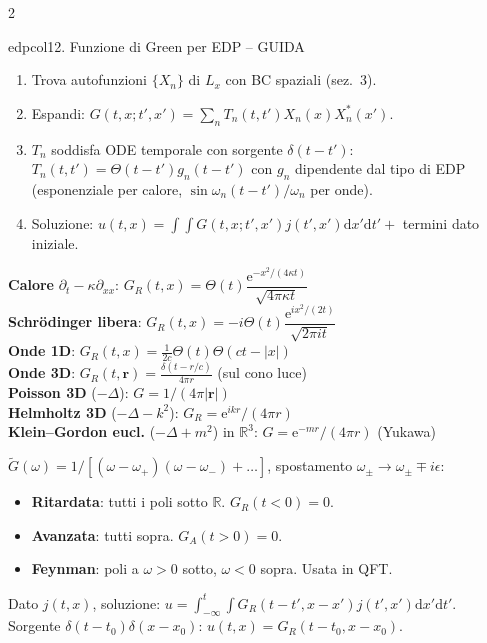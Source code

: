 \documentclass[10pt,a4paper]{article}
\newcommand{\R}{\mathbb{R}}
\newcommand{\dd}{\mathrm{d}}
\newcommand{\eu}{\mathrm{e}}
\begin{document}
\begin{multicols}{2}
\begin{secbox}{edpcol}{12. Funzione di Green per EDP -- GUIDA}
\begin{enumerate}
\item Trova autofunzioni $\{X_n\}$ di $L_x$ con BC spaziali (sez.\ 3).
\item Espandi: $G(t,x;t',x')=\sum_nT_n(t,t')X_n(x)X_n^*(x')$.
\item $T_n$ soddisfa ODE temporale con sorgente $\delta(t-t')$: $T_n(t,t')=\Theta(t-t')g_n(t-t')$ con $g_n$ dipendente dal tipo di EDP (esponenziale per calore, $\sin\omega_n(t-t')/\omega_n$ per onde).
\item Soluzione: $u(t,x)=\int\!\!\int G(t,x;t',x')j(t',x')\dd x'\dd t'+$ termini dato iniziale.
\end{enumerate}

\textbf{Calore} $\partial_t-\kappa\partial_{xx}$: $G_R(t,x)=\Theta(t)\dfrac{\eu^{-x^2/(4\kappa t)}}{\sqrt{4\pi\kappa t}}$\\
\textbf{Schr\"odinger libera}: $G_R(t,x)=-i\Theta(t)\dfrac{\eu^{ix^2/(2t)}}{\sqrt{2\pi it}}$\\
\textbf{Onde 1D}: $G_R(t,x)=\frac{1}{2c}\Theta(t)\Theta(ct-|x|)$\\
\textbf{Onde 3D}: $G_R(t,\bm r)=\frac{\delta(t-r/c)}{4\pi r}$ (sul cono luce)\\
\textbf{Poisson 3D} ($-\Delta$): $G=1/(4\pi|\bm r|)$\\
\textbf{Helmholtz 3D} ($-\Delta-k^2$): $G_R=\eu^{ikr}/(4\pi r)$\\
\textbf{Klein--Gordon eucl.} ($-\Delta+m^2$) in $\R^3$: $G=\eu^{-mr}/(4\pi r)$ (Yukawa)

$\tilde G(\omega)=1/[(\omega-\omega_+)(\omega-\omega_-)+\dots]$, spostamento $\omega_\pm\to\omega_\pm\mp i\epsilon$:
\begin{itemize}
\item \textbf{Ritardata}: tutti i poli sotto $\R$. $G_R(t<0)=0$.
\item \textbf{Avanzata}: tutti sopra. $G_A(t>0)=0$.
\item \textbf{Feynman}: poli a $\omega>0$ sotto, $\omega<0$ sopra. Usata in QFT.
\end{itemize}

Dato $j(t,x)$, soluzione: $u=\int_{-\infty}^t\!\!\int G_R(t-t',x-x')j(t',x')\dd x'\dd t'$.\\
Sorgente $\delta(t-t_0)\delta(x-x_0)$: $u(t,x)=G_R(t-t_0,x-x_0)$.

\end{secbox}


\end{multicols}
\end{document}
